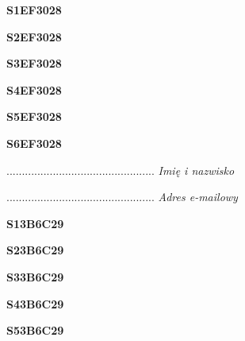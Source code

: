 \begin{turn}{90}\huge \textbf{S1EF3028}\end{turn}

\begin{turn}{90}\huge \textbf{S2EF3028}\end{turn}

\begin{turn}{90}\huge \textbf{S3EF3028}\end{turn}

\begin{turn}{90}\huge \textbf{S4EF3028}\end{turn}

\begin{turn}{90}\huge \textbf{S5EF3028}\end{turn}

\begin{turn}{90}\huge \textbf{S6EF3028}\end{turn}

\begin{turn}{90}\begin{minipage}{\linewidth} \vspace{20mm} ................................................  \textit{Imię i nazwisko}\end{minipage}\end{turn}

\begin{turn}{90}\begin{minipage}{\linewidth} \vspace{20mm} ................................................  \textit{Adres e-mailowy}\end{minipage}\end{turn}

\begin{turn}{90}\huge \textbf{S13B6C29}\end{turn}

\begin{turn}{90}\huge \textbf{S23B6C29}\end{turn}

\begin{turn}{90}\huge \textbf{S33B6C29}\end{turn}

\begin{turn}{90}\huge \textbf{S43B6C29}\end{turn}

\begin{turn}{90}\huge \textbf{S53B6C29}\end{turn}

